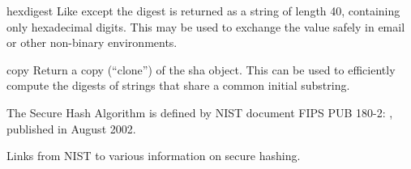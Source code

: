 \begin{methoddesc}[sha]{hexdigest}{}
Like  except the digest is returned as a string of
length 40, containing only hexadecimal digits.  This may 
be used to exchange the value safely in email or other non-binary
environments.
\end{methoddesc}

\begin{methoddesc}[sha]{copy}{}
Return a copy (``clone'') of the sha object.  This can be used to
efficiently compute the digests of strings that share a common initial
substring.
\end{methoddesc}

\begin{seealso}
    {The Secure Hash Algorithm is defined by NIST document FIPS
     PUB 180-2:
     , published in August 2002.}

           {Links from NIST to various information on secure hashing.}
\end{seealso}


